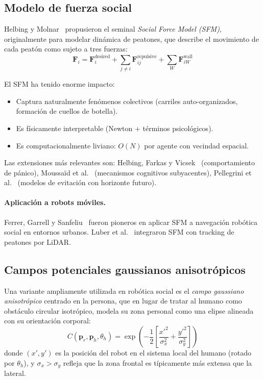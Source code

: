 \documentclass[12pt,a4paper,oneside]{book}
\begin{document}
\subsection{Modelo de fuerza social}

Helbing y Molnar~\cite{Helbing1995} propusieron el seminal \emph{Social Force Model (SFM)}, originalmente para modelar dinámica de peatones, que describe el movimiento de cada peatón como sujeto a tres fuerzas:
\begin{equation}
\mathbf{F}_i = \mathbf{F}_i^{\text{desired}} + \sum_{j \neq i} \mathbf{F}_{ij}^{\text{repulsive}} + \sum_W \mathbf{F}_{iW}^{\text{wall}}
\end{equation}

El SFM ha tenido enorme impacto: 
\begin{itemize}
    \item Captura naturalmente fenómenos colectivos (carriles auto-organizados, formación de cuellos de botella).
    \item Es físicamente interpretable (Newton + términos psicológicos).
    \item Es computacionalmente liviano: $O(N)$ por agente con vecindad espacial.
\end{itemize}

Las extensiones más relevantes son: Helbing, Farkas y Vicsek~\cite{Helbing2000,Helbing2002} (comportamiento de pánico), Moussaïd et al.~\cite{Moussaid2009,Moussaid2010} (mecanismos cognitivos subyacentes), Pellegrini et al.~\cite{Pellegrini2009} (modelos de evitación con horizonte futuro).

\paragraph{Aplicación a robots móviles.} Ferrer, Garrell y Sanfeliu~\cite{Ferrer2013,Ferrer2014} fueron pioneros en aplicar SFM a navegación robótica social en entornos urbanos. Luber et al.~\cite{Luber2010} integraron SFM con tracking de peatones por LiDAR.

\subsection{Campos potenciales gaussianos anisotrópicos}

Una variante ampliamente utilizada en robótica social es el \emph{campo gaussiano anisotrópico} centrado en la persona, que en lugar de tratar al humano como obstáculo circular isotrópico, modela su zona personal como una elipse alineada con su orientación corporal:
\begin{equation}
C(\mathbf{p}_r, \mathbf{p}_h, \theta_h) = \exp\left( -\frac{1}{2}\left[ \frac{x'^2}{\sigma_x^2} + \frac{y'^2}{\sigma_y^2} \right] \right)
\label{doc7:eq:gaussian_aniso}
\end{equation}
donde $(x', y')$ es la posición del robot en el sistema local del humano (rotado por $\theta_h$), y $\sigma_x > \sigma_y$ refleja que la zona frontal es típicamente más extensa que la lateral.
\end{document}
